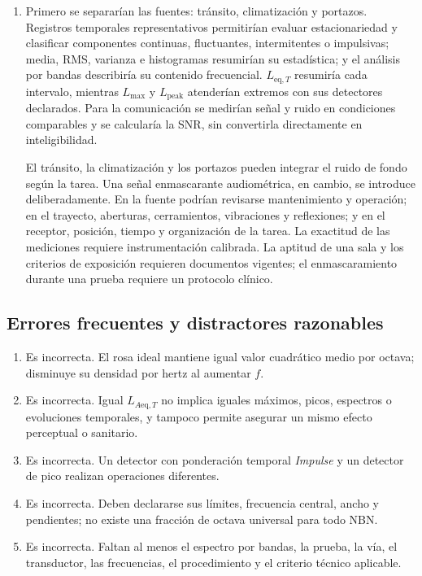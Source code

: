 \begin{enumerate}[label=\textbf{I\arabic*.},leftmargin=*]
    \item Primero se separarían las fuentes: tránsito, climatización y
    portazos. Registros temporales representativos permitirían evaluar
    estacionariedad y clasificar componentes continuas, fluctuantes,
    intermitentes o impulsivas; media, RMS, varianza e histogramas resumirían
    su estadística; y el análisis por bandas describiría su contenido
    frecuencial. \(L_{\mathrm{eq},T}\) resumiría cada intervalo, mientras
    \(L_{\mathrm{max}}\) y \(L_{\mathrm{peak}}\) atenderían extremos con sus
    detectores declarados. Para la comunicación se medirían señal y ruido en
    condiciones comparables y se calcularía la SNR, sin convertirla
    directamente en inteligibilidad.

    El tránsito, la climatización y los portazos pueden integrar el ruido de
    fondo según la tarea. Una señal enmascarante audiométrica, en cambio, se
    introduce deliberadamente. En la fuente podrían revisarse mantenimiento y
    operación; en el trayecto, aberturas, cerramientos, vibraciones y
    reflexiones; y en el receptor, posición, tiempo y organización de la
    tarea. La exactitud de las mediciones requiere instrumentación calibrada.
    La aptitud de una sala y los criterios de exposición requieren documentos
    vigentes; el enmascaramiento durante una prueba requiere un protocolo
    clínico.
\end{enumerate}

\subsection*{Errores frecuentes y distractores razonables}

\begin{enumerate}[label=\textbf{D\arabic*.},leftmargin=*]
    \item Es incorrecta. El rosa ideal mantiene igual valor cuadrático medio
    por octava; disminuye su densidad por hertz al aumentar \(f\).
    \item Es incorrecta. Igual \(L_{A\mathrm{eq},T}\) no implica iguales máximos,
    picos, espectros o evoluciones temporales, y tampoco permite asegurar un
    mismo efecto perceptual o sanitario.
    \item Es incorrecta. Un detector con ponderación temporal
    \emph{Impulse} y un detector de pico realizan operaciones diferentes.
    \item Es incorrecta. Deben declararse sus límites, frecuencia central,
    ancho y pendientes; no existe una fracción de octava universal para todo
    NBN.
    \item Es incorrecta. Faltan al menos el espectro por bandas, la prueba, la
    vía, el transductor, las frecuencias, el procedimiento y el criterio
    técnico aplicable.
\end{enumerate}

